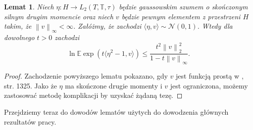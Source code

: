 \documentclass[man,mfiu]{mgrwms}
\newcommand{\norm}[1]{\left\lVert#1\right\rVert}
\newtheorem{lm}{Lemat}[chapter]
\begin{document}
\begin{lm}\label{szacowanie}
Niech $\eta\colon H\to L_2(T,\mathbb{T},\tau)$ będzie gaussowskim szumem o skończonym silnym drugim momencie oraz niech $v$ będzie pewnym elementem z przestrzeni $H$ takim, że $\norm{v}_{\infty}<\infty$. Załóżmy, że zachodzi $\langle \eta, v\rangle\sim \mathcal{N}(0,1)$. Wtedy dla dowolnego $t>0$ zachodzi
\begin{displaymath}
\ln\mathbb{E}\exp\left(t\langle \eta^2 -1,v\rangle\right)\leq \frac{t^2\norm{v}^2_2}{1-t\norm{v}_{\infty}}.
\end{displaymath}
\end{lm}
\begin{proof}
Zachodzenie powyższego lematu pokazano, gdy $v$ jest funkcją prostą w \cite{laurent}, str. 1325. Jako że $\eta$ ma skończone drugie momenty i $v$ jest ograniczona, możemy zastosować metodę komplikacji by uzyskać żądaną tezę.
\end{proof}
Przejdziemy teraz do dowodów lematów użytych do dowodzenia głównych rezultatów pracy.
\end{document}
